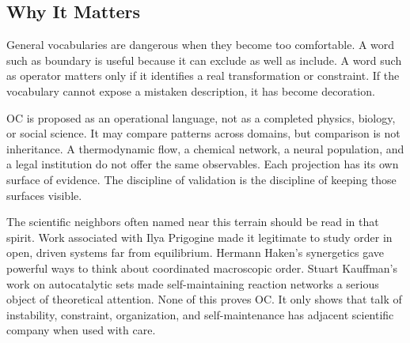 \documentclass[11pt,a4paper,openany]{book}
\begin{document}
\subsection{Why It Matters}
General vocabularies are dangerous when they become too comfortable. A word such as boundary is useful because it can exclude as well as include. A word such as operator matters only if it identifies a real transformation or constraint. If the vocabulary cannot expose a mistaken description, it has become decoration. \cite{prigogine_dissipative,haken_synergetics}\par
OC is proposed as an operational language, not as a completed physics, biology, or social science. It may compare patterns across domains, but comparison is not inheritance. A thermodynamic flow, a chemical network, a neural population, and a legal institution do not offer the same observables. Each projection has its own surface of evidence. The discipline of validation is the discipline of keeping those surfaces visible.\par
The scientific neighbors often named near this terrain should be read in that spirit. Work associated with Ilya Prigogine made it legitimate to study order in open, driven systems far from equilibrium. Hermann Haken's synergetics gave powerful ways to think about coordinated macroscopic order. Stuart Kauffman's work on autocatalytic sets made self-maintaining reaction networks a serious object of theoretical attention. None of this proves OC. It only shows that talk of instability, constraint, organization, and self-maintenance has adjacent scientific company when used with care.\par
\end{document}
